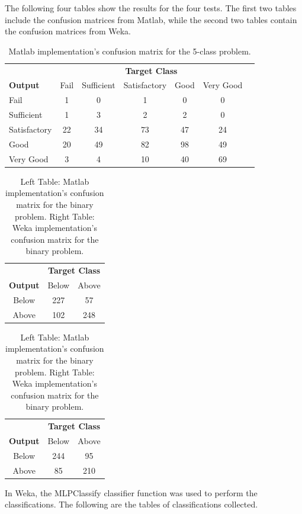 The following four tables show the results for the four tests. The first two tables include the confusion matrices from Matlab, while the second two tables contain the confusion matrices from Weka. 

\begin{table}[h!]
  \centering
  \begin{tabular}{l|cccccc}
     & \multicolumn{5}{c}{\textbf{Target Class}} \\ 
    \textbf{Output} & Fail & Sufficient & Satisfactory & Good & Very Good\\
    \hline
    Fail & 1 & 0 & 1 & 0 & 0\\ 
    Sufficient & 1 & 3 & 2 & 2 & 0\\ 
    Satisfactory & 22 & 34 & 73 & 47 & 24\\  
    Good & 20 & 49 & 82 & 98 & 49\\  
    Very Good & 3 & 4 & 10 & 40 & 69\\
  \end{tabular}
  \caption{Matlab implementation's confusion matrix for the 5-class problem.}
  \label{tab:table1}
\end{table}



\begin{table}[h!]
  \centering
  \begin{tabular}{c|cc}
    & \multicolumn{2}{c}{\textbf{Target Class}} \\ 
    \textbf{Output} & Below & Above \\ \hline 
     Below & 227 & 57\\ 
     Above & 102 & 248\\ 
  \end{tabular}
  \quad
  \begin{tabular}{c|cc}
    & \multicolumn{2}{c}{\textbf{Target Class}} \\
    \textbf{Output} & Below & Above\\ \hline
    Below & 244 & 95  \\
    Above & 85 & 210 \\
  \end{tabular}
  
  \caption{Left Table: Matlab implementation's confusion matrix for the binary problem. Right Table: Weka implementation's confusion matrix for the binary problem.}
  \label{tab:table1}
\end{table}

In Weka, the MLPClassify classifier function was used to perform the classifications. The following are the tables of classifications collected.

